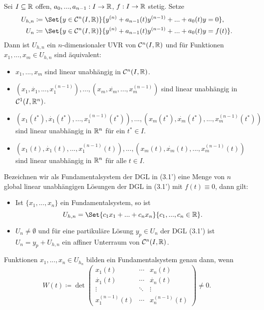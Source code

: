 \documentclass{cheat-sheet}
\begin{document}
\begin{satz}
  Sei $I \subseteq \mathbb{R}$ offen, $a_0, ..., a_{n-1} : I \to \mathbb{R}$, $f : I \to \mathbb{R}$ stetig. Setze
  \begin{align*}
    U_{h,n} &\coloneqq \Set{ y \in \mathcal{C}^n(I, \R) }{ y^{(n)} + a_{n-1}(t) y^{(n-1)} + ... + a_0(t) y = 0 },\\
    U_{n} &\coloneqq \Set{ y \in \mathcal{C}^n(I, \R) }{ y^{(n)} + a_{n-1}(t) y^{(n-1)} + ... + a_0(t) y = f(t) }.
  \end{align*}
  Dann ist $U_{h,n}$ ein $n$-dimensionaler UVR von $\mathcal{C}^n(I, \mathbb{R})$ und für Funktionen $x_1, ..., x_m \in U_{h,n}$ sind äquivalent:
  \begin{itemize}
    \item $x_1, ..., x_m$ sind linear unabhängig in $\mathcal{C}^n(I, \mathbb{R})$.
    \item $(x_1, \dot{x_1}, ..., x_1^{(n-1)}), ..., (x_m, \dot{x_m}, ..., x_m^{(n-1)})$ sind linear unabhängig in $\mathcal{C}^1(I, \mathbb{R}^n)$.
    \item $(x_1(t^*), \dot{x_1}(t^*), ..., x_1^{(n-1)}(t^*)), ..., (x_m(t^*), \dot{x_m}(t^*), ..., x_m^{(n-1)}(t^*))$ sind linear unabhängig in $\mathbb{R}^n$ für ein $t^* \in I$.
    \item $(x_1(t), \dot{x_1}(t), ..., x_1^{(n-1)}(t)), ..., (x_m(t), \dot{x_m}(t), ..., x_m^{(n-1)}(t))$ sind linear unabhängig in $\mathbb{R}^n$ für alle $t \in I$.
  \end{itemize}
  Bezeichnen wir als Fundamentalsystem der DGL in (3.1') eine Menge von $n$ global linear unabhängigen Lösungen der DGL in (3.1') mit $f(t) \equiv 0$, dann gilt:
  \begin{itemize}
    \item Ist $\{ x_1, ..., x_n \}$ ein Fundamentalsystem, so ist
    \[ U_{h,n} = \Set{c_1 x_1 + ... + c_n x_n}{c_1, ..., c_n \in \R}. \]
    \item $U_n \not= \emptyset$ und für eine partikuläre Lösung $y_p \in U_n$ der DGL (3.1') ist $U_n = y_p + U_{h,n}$ ein affiner Unterraum von $\mathcal{C}^n(I, \mathbb{R})$.
  \end{itemize}
\end{satz}

\begin{bem}
  Funktionen $x_1, ..., x_n \in U_{h_n}$ bilden ein Fundamentalsystem genau dann, wenn
  \[
    W(t) \coloneqq \det \begin{pmatrix}
      x_1(t) & \cdots & x_n(t) \\
      \dot{x_1}(t) & \cdots & \dot{x_n}(t) \\
      \vdots & \ddots & \vdots \\
      x_1^{(n-1)}(t) & \cdots & x_n^{(n-1)}(t)
    \end{pmatrix} \not= 0.
  \]
\end{bem}
\end{document}
